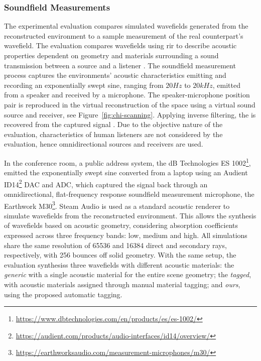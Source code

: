 \subsubsection{Soundfield Measurements}
The experimental evaluation compares simulated wavefields generated from the reconstructed environment to a sample measurement of the real counterpart's wavefield. The evaluation compares wavefields using \acrshort{rir} to describe acoustic properties dependent on geometry and materials surrounding a sound transmission between a source and a listener \citep{stan2002comparison}. The soundfield measurement process captures the environments' acoustic characteristics emitting and recording an exponentially swept sine, ranging from $20Hz$ to $20kHz$, emitted from a speaker and received by a microphone. The speaker-microphone position pair is reproduced in the virtual reconstruction of the space using a virtual sound source and receiver, see Figure~\ref{fig:chi-scanning}. Applying inverse filtering, the  is recovered from the captured signal \citep{holters2009impulse}. Due to the objective nature of the evaluation, characteristics of human listeners are not considered by the evaluation, hence omnidirectional sources and receivers are used.\par
In the conference room, a public address system, the dB Technologies ES 1002\footnote{\url{https://www.dbtechnologies.com/en/products/es/es-1002/}}, emitted the exponentially swept sine converted from a laptop using an Audient ID14\footnote{\url{https://audient.com/products/audio-interfaces/id14/overview/}} DAC and ADC, which captured the signal back through an omnidirectional, flat-frequency response soundfield measurement microphone, the Earthwork M30\footnote{\url{https://earthworksaudio.com/measurement-microphones/m30/}}.
Steam Audio \citep{audio2020git} is used as a standard acoustic renderer to simulate wavefields from the reconstructed environment. This allows the synthesis of wavefields based on acoustic geometry, considering absorption coefficients expressed across three frequency bands: low, medium and high. All simulations share the same resolution of 65536 and 16384 direct and secondary rays, respectively, with 256 bounces off solid geometry. With the same setup, the evaluation synthesiss three wavefields with different acoustic materials: the \emph{generic} with a single acoustic material for the entire scene geometry; the \emph{tagged}, with acoustic materials assigned through manual material tagging; and \emph{ours}, using the proposed automatic tagging.

